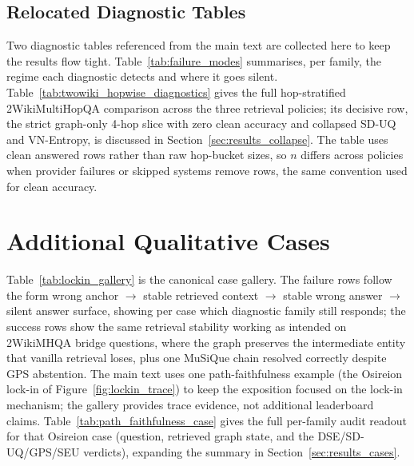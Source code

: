 \subsection{Relocated Diagnostic Tables}
\label{sec:appendix_relocated}

Two diagnostic tables referenced from the main text are collected here to keep
the results flow tight.
Table~\ref{tab:failure_modes} summarises, per family, the regime each
diagnostic detects and where it goes silent.
Table~\ref{tab:twowiki_hopwise_diagnostics} gives the full hop-stratified
2WikiMultiHopQA comparison across the three retrieval policies; its decisive
row, the strict graph-only 4-hop slice with zero clean accuracy and collapsed
SD-UQ and VN-Entropy, is discussed in Section~\ref{sec:results_collapse}.
The table uses clean answered rows rather than raw hop-bucket sizes, so $n$
differs across policies when provider failures or skipped systems remove
rows, the same convention used for clean accuracy.





\section{Additional Qualitative Cases}
\label{sec:appendix_cases}



Table~\ref{tab:lockin_gallery} is the canonical case gallery.
The failure rows follow the form wrong anchor $\to$ stable retrieved context
$\to$ stable wrong answer $\to$ silent answer surface, showing per case which
diagnostic family still responds; the success rows show the same retrieval
stability working as intended on 2WikiMHQA bridge questions, where the graph
preserves the intermediate entity that vanilla retrieval loses, plus one
MuSiQue chain resolved correctly despite GPS abstention.
The main text uses one path-faithfulness example
(the Osireion lock-in of Figure~\ref{fig:lockin_trace}) to keep the exposition
focused on the lock-in mechanism; the gallery provides trace evidence, not
additional leaderboard claims.
Table~\ref{tab:path_faithfulness_case} gives the full per-family audit readout
for that Osireion case (question, retrieved graph state, and the
DSE/SD-UQ/GPS/SEU verdicts), expanding the summary in
Section~\ref{sec:results_cases}.

